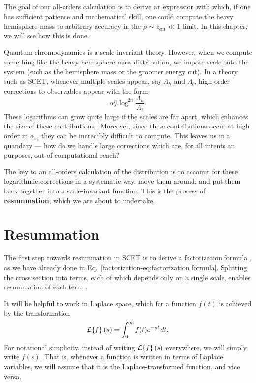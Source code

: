 \documentclass[12pt,twoside,class=../reedthesis, crop=false]{standalone}
\providecommand{\zcut}{z_\mathrm{{cut}}}
\providecommand{\cL}{\mathcal{L}}
\begin{document}
	The goal of our all-orders calculation is to derive an expression with which, if one has sufficient patience and mathematical skill, one could compute the heavy hemisphere mass to arbitrary accuracy in the $\rho \sim \zcut \ll 1$ limit. In this chapter, we will see how this is done.

	Quantum chromodynamics is a scale-invariant theory. However, when we compute something like the heavy hemisphere mass distribution, we impose scale onto the system (such as the hemisphere mass or the groomer energy cut). In a theory such as SCET, whenever multiple scales appear, say $\Lambda_h$ and $\Lambda_\ell$, high-order corrections to observables appear with the form \cite{becher_introduction_2015-1}
	\begin{equation}
		\alpha_s^n \log^{2n}\frac{\Lambda_h}{\Lambda_\ell}.
	\end{equation}
	These logarithms can grow quite large if the scales are far apart, which enhances the size of these contributions \cite{schwartz_quantum_2014}. Moreover, since these contributions occur at high order in $\alpha_s$, they can be incredibly difficult to compute. This leaves us in a quandary --- how do we handle large corrections which are, for all intents an purposes, out of computational reach?

	The key to an all-orders calculation of the distribution is to account for these logarithmic corrections in a systematic way, move them around, and put them back together into a scale-invariant function. This is the process of \textbf{resummation}, which we are about to undertake.

\section{Resummation}
	The first step towards resummation in SCET is to derive a factorization formula \cite{becher_introduction_2015-1}, as we have already done in Eq.~\ref{factorization-eq:factorization formula}. Splitting the cross section into terms, each of which depends only on a single scale, enables resummation of each term \cite{frye_factorization_2016}.

	It will be helpful to work in Laplace space, which for a function $f(t)$ is achieved by the transformation \cite{boas_mathematical_2006}
	\begin{equation}
		\cL\qty{f}(s) = \int_0^\infty f(t) e^{-st}\,dt.
	\end{equation}
	For notational simplicity, instead of writing $\cL\qty{f}(s)$ everywhere, we will simply write $f(s)$. That is, whenever a function is written in terms of Laplace variables, we will assume that it is the Laplace-transformed function, and vice versa.
\end{document}
